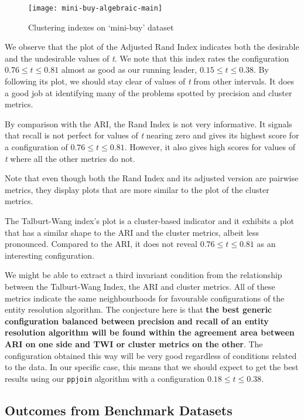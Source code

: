 \begin{figure}[htbp]
    \centering
    \captionsetup{justification=centering}
    \texttt{[image: mini-buy-algebraic-main]}
    \caption{Clustering indexes on `mini-buy' dataset}\label{fig:mini-alg}
\end{figure}

We observe that the plot of the Adjusted Rand Index indicates both the desirable
and the undesirable values of \textit{t}.
We note that this index rates the configuration $0.76 \le t \le 0.81$ almost as
good as our running leader, $0.15 \le t \le 0.38$.
By following its plot, we should stay clear of values of \textit{t} from other
intervals.
It does a good job at identifying many of the problems spotted by precision and
cluster metrics.

By comparison with the ARI, the Rand Index is not very informative.
It signals that recall is not perfect for values of \textit{t} nearing zero and
gives its highest score for a configuration of $0.76 \le t \le 0.81$.
However, it also gives high scores for values of \textit{t} where all the other
metrics do not.

Note that even though both the Rand Index and its adjusted version are pairwise
metrics, they display plots that are more similar to the plot of the cluster
metrics.

The Talburt-Wang index's plot is a cluster-based indicator and it exhibits a
plot that has a similar shape to the ARI and the cluster metrics, albeit less
pronounced.
Compared to the ARI, it does not reveal $0.76 \le t \le 0.81$ as an interesting
configuration.

We might be able to extract a third invariant condition from the relationship
between the Talburt-Wang Index, the ARI and cluster metrics.
All of these metrics indicate the same neighbourhoods for favourable
configurations of the entity resolution algorithm.
The conjecture here is that \textbf{the best generic configuration balanced
    between precision and recall of an entity resolution algorithm will be found
    within the agreement area between ARI on one side and TWI or cluster metrics on
    the other}.
The configuration obtained this way will be very good regardless of conditions
related to the data.
In our specific case, this means that we should expect to get the best results
using our \texttt{ppjoin} algorithm with a configuration $0.18 \le t \le 0.38$.

\subsection{Outcomes from Benchmark Datasets}\label{subsec:Benchmark Datasets}

